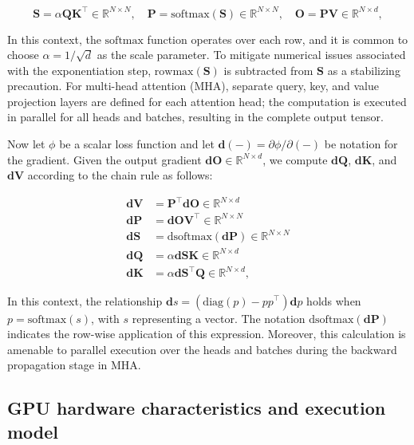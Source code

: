 \begin{equation*}
  \mathbf{S} = \alpha \mathbf{Q} \mathbf{K}^\top \in \mathbb{R}^{N \times N}, \quad \mathbf{P} = \mathrm{softmax}(\mathbf{S}) \in \mathbb{R}^{N \times N}, \quad \mathbf{O} = \mathbf{P}\mathbf{V} \in \mathbb{R}^{N \times d},
\end{equation*}

In this context, the $\mathrm{softmax}$ function operates over each row, and it is common to choose $\alpha = 1/\sqrt{d}$ as the scale parameter. To mitigate numerical issues associated with the exponentiation step, $\mathrm{rowmax}(\mathbf{S})$ is subtracted from $\mathbf{S}$ as a stabilizing precaution. For multi-head attention (MHA), separate query, key, and value projection layers are defined for each attention head; the computation is executed in parallel for all heads and batches, resulting in the complete output tensor.

Now let $\phi$ be a scalar loss function and let $\mathbf{d}(-) = \partial \phi / \partial (-)$ be notation for the gradient. Given the output gradient $\mathbf{dO} \in \mathbb{R}^{N \times d}$, we compute $\mathbf{dQ}$, $\mathbf{dK}$, and $\mathbf{dV}$ according to the chain rule as follows:

\begin{align*}
  \mathbf{dV} &= \mathbf{P}^\top \mathbf{dO} \in \mathbb{R}^{N \times d} \\
  \mathbf{dP} &= \mathbf{dO} \mathbf{V}^\top \in \mathbb{R}^{N \times N} \\
  \mathbf{dS} &= \mathrm{dsoftmax} (\mathbf{dP}) \in \mathbb{R}^{N \times N} \\
  \mathbf{dQ} &= \alpha \mathbf{dS} \mathbf{K} \in \mathbb{R}^{N \times d} \\
  \mathbf{dK} &= \alpha \mathbf{dS}^\top \mathbf{Q} \in \mathbb{R}^{N \times d},
\end{align*}

In this context, the relationship $\mathbf{d}s = (\mathrm{diag}(p) - p p^\top)\mathbf{d}p$ holds when $p = \mathrm{softmax}(s)$, with $s$ representing a vector. The notation $\mathrm{dsoftmax}(\mathbf{dP})$ indicates the row-wise application of this expression. Moreover, this calculation is amenable to parallel execution over the heads and batches during the backward propagation stage in MHA.

\subsection{GPU hardware characteristics and execution model}
\label{subsec:hardware}

